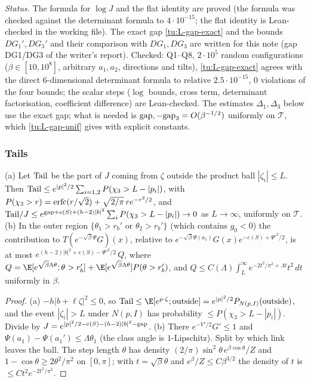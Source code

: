 \noindent\emph{Status.} The formula for $\log J$ and the flat identity are proved (the formula was checked against the
determinant formula to $4\cdot10^{-15}$; the flat identity is Lean-checked in the working file). The exact gap
\eqref{tu:L-gap-exact} and the bounds $DG_1',DG_3'$ and their comparison with $DG_1,DG_3$ are written for this note
(gap DG1/DG3 of the writer's report). Checked:  Q1--Q8, $2\cdot10^5$ random configurations
($\beta\in[10,10^8]$, arbitrary $a_1,a_2$, directions and tilts), \eqref{tu:L-gap-exact} agrees with the direct
$6$-dimensional determinant formula to relative $2.5\cdot10^{-15}$, $0$ violations of the four bounds; the scalar steps
($\log$ bounds, cross term, determinant factorisation, coefficient difference) are Lean-checked. The
estimates $\Delta_1,\Delta_3$ below use the exact gap; what is needed is ${\rm gap},-{\rm gap}_3=O(\beta^{-1/2})$
uniformly on $\mathcal T$, which \eqref{tu:L-gap-unif} gives with explicit constants.

\subsubsection*{Tails}

\begin{lemma}\label{tu:L-tails}
(a) Let ${\rm Tail}$ be the part of $J$ coming from $\zeta$ outside the product ball $|\zeta_i|\le L$. Then
${\rm Tail}\le e^{|p|^2/2}\sum_{i=1,2}P(\chi_3>L-|p_i|)$, with
$P(\chi_3>r)={\rm erfc}(r/\sqrt2)+\sqrt{2/\pi}\,re^{-r^2/2}$, and
${\rm Tail}/J\le e^{{\rm gap}+e(S)+(h-2)|b|^2}\sum_iP(\chi_3>L-|p_i|)\to0$ as $L\to\infty$, uniformly on $\mathcal T$.
(b) In the outer region $\{\theta_1>r_b'\text{ or }\theta_2>r_b'\}$ (which contains $g_0<0$) the contribution
to $T(e^{-\sqrt\beta\Psi}G)(x)$, relative to $e^{-\sqrt\beta\Psi(a_1)}G(x)e^{-e(S)+\Psi'^2/2}$, is at most
$e^{(h-2)|b|^2+e(S)-\Psi'^2/2}\,Q$, where
$Q=\E[e^{\sqrt\beta\Lambda\theta};\theta>r_b']+\E[e^{\sqrt\beta\Lambda\theta}]P(\theta>r_b')$, and
$Q\le C(\Lambda)\int_L^\infty e^{-2t^2/\pi^2+\Lambda t}t^2\,dt$ uniformly in $\beta$.
\end{lemma}

\begin{proof}
(a) $-h|b+\ell\zeta|^2\le0$, so ${\rm Tail}\le\E[e^{p\cdot\zeta};\text{outside}]=e^{|p|^2/2}P_{N(p,I)}(\text{outside})$, and
the event $|\zeta_i|>L$ under $N(p,I)$ has probability $\le P(\chi_3>L-|p_i|)$. Divide by
$J=e^{|p|^2/2-e(S)-(h-2)|b|^2-{\rm gap}}$.
(b) There $e^{-V'/2}G'\le1$ and $\Psi(a_1)-\Psi(a_1')\le\Lambda\theta_1$ (the class angle is $1$-Lipschitz). Split
by which link leaves the ball. The step length $\theta$ has density $(2/\pi)\sin^2\theta\,e^{\beta\cos\theta}/Z$ and
$1-\cos\theta\ge2\theta^2/\pi^2$ on $[0,\pi]$; with $t=\sqrt\beta\theta$ and $e^\beta/Z\le C\beta^{3/2}$ the density of $t$
is $\le Ct^2e^{-2t^2/\pi^2}$.
\end{proof}

